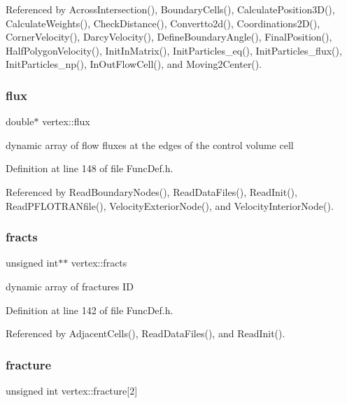 Referenced by Across\+Intersection(), Boundary\+Cells(), Calculate\+Position3\+D(), Calculate\+Weights(), Check\+Distance(), Convertto2d(), Coordinations2\+D(), Corner\+Velocity(), Darcy\+Velocity(), Define\+Boundary\+Angle(), Final\+Position(), Half\+Polygon\+Velocity(), Init\+In\+Matrix(), Init\+Particles\+\_\+eq(), Init\+Particles\+\_\+flux(), Init\+Particles\+\_\+np(), In\+Out\+Flow\+Cell(), and Moving2\+Center().

\mbox{\label{structvertex_a9934ed428ad1db71c9aa1e601649791c}} 
\subsubsection{\texorpdfstring{flux}{flux}}
{\footnotesize\ttfamily double$\ast$ vertex\+::flux}

dynamic array of flow fluxes at the edges of the control volume cell 

Definition at line 148 of file Func\+Def.\+h.



Referenced by Read\+Boundary\+Nodes(), Read\+Data\+Files(), Read\+Init(), Read\+P\+F\+L\+O\+T\+R\+A\+Nfile(), Velocity\+Exterior\+Node(), and Velocity\+Interior\+Node().

\mbox{\label{structvertex_adc1951216db706914f5963da2e58accc}} 
\subsubsection{\texorpdfstring{fracts}{fracts}}
{\footnotesize\ttfamily unsigned int$\ast$$\ast$ vertex\+::fracts}

dynamic array of fractures ID 

Definition at line 142 of file Func\+Def.\+h.



Referenced by Adjacent\+Cells(), Read\+Data\+Files(), and Read\+Init().

\mbox{\label{structvertex_aa2cd06573422bc415cb8f38a67232de7}} 
\subsubsection{\texorpdfstring{fracture}{fracture}}
{\footnotesize\ttfamily unsigned int vertex\+::fracture\mbox{[}2\mbox{]}}

